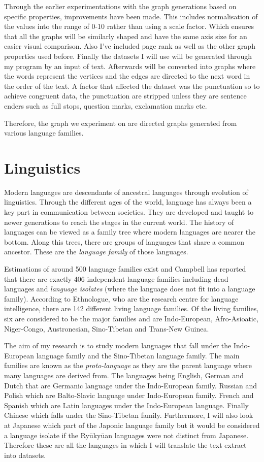 Through the earlier experimentations with the graph generations based on specific properties, improvements have been made. This includes normalisation of the values into the range of 0-10 rather than using a scale factor. Which ensures that all the graphs will be similarly shaped and have the same axis size for an easier visual comparison. Also I've included page rank as well as the other graph properties used before. Finally the datasets I will use will be generated through my program by an input of text. Afterwards will be converted into graphs where the words represent the vertices and the edges are directed to the next word in the order of the text. A factor that affected the dataset was the punctuation so to achieve congruent data, the punctuation are stripped unless they are sentence enders such as full stops, question marks, exclamation marks etc. 

Therefore, the graph we experiment on are directed graphs generated from various language families.

\section{Linguistics}
Modern languages are descendants of ancestral languages through evolution of linguistics. Through the different ages of the world, language has always been a key part in communication between societies. They are developed and taught to newer generations to reach the stages in the current world. The history of languages can be viewed as a family tree where modern languages are nearer the bottom. Along this trees, there are groups of languages that share a common ancestor. These are the \emph{language family} of those languages.

Estimations of around 500 language families exist and Campbell \cite{campbell2018many} has reported that there are exactly 406 independent language families including dead languages and \emph{language isolates} (where the language does not fit into a language family). According to Ethnologue\cite{eberhard2023a}, who are the research centre for language intelligence, there are 142 different living language families. Of the living families, six are considered to be the major families and are Indo-European, Afro-Asioatic, Niger-Congo, Austronesian, Sino-Tibetan and Trans-New Guinea.

The aim of my research is to study modern languages that fall under the Indo-European language family and the Sino-Tibetan language family. The main families are known as the \emph{proto-language} as they are the parent language where many languages are derived from\cite{rowe2022concise}. The languages being English, German and Dutch that are Germanic language under the Indo-European family. Russian and Polish which are Balto-Slavic language under Indo-European family.  French and Spanish which are Latin languages under the Indo-European language. Finally Chinese which falls under the Sino-Tibetan family. Furthermore, I will also look at Japanese which part of the Japonic language family but it would be considered a language isolate if the Ryūkyūan languages were not distinct from Japanese\cite{campbell2010language}. Therefore these are all the languages in which I will translate the text extract into datasets.

